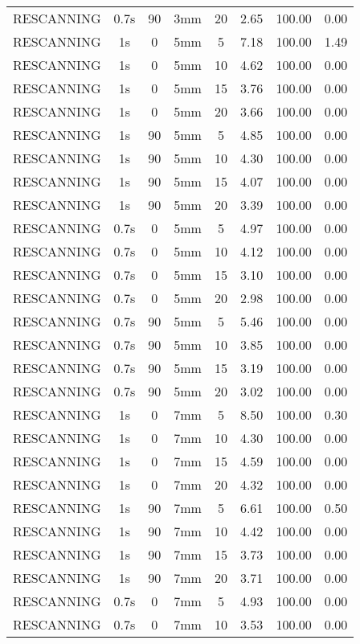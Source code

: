 \begin{table}[H]
\begin{tabular}{|c||c|c|c|c||c|c|c|}
RESCANNING & 0.7s & 90 & 3mm & 20 & 2.65 & 100.00 & 0.00 \\
RESCANNING & 1s & 0 & 5mm & 5 & 7.18 & 100.00 & 1.49 \\
RESCANNING & 1s & 0 & 5mm & 10 & 4.62 & 100.00 & 0.00 \\
RESCANNING & 1s & 0 & 5mm & 15 & 3.76 & 100.00 & 0.00 \\
RESCANNING & 1s & 0 & 5mm & 20 & 3.66 & 100.00 & 0.00 \\
RESCANNING & 1s & 90 & 5mm & 5 & 4.85 & 100.00 & 0.00 \\
RESCANNING & 1s & 90 & 5mm & 10 & 4.30 & 100.00 & 0.00 \\
RESCANNING & 1s & 90 & 5mm & 15 & 4.07 & 100.00 & 0.00 \\
RESCANNING & 1s & 90 & 5mm & 20 & 3.39 & 100.00 & 0.00 \\
RESCANNING & 0.7s & 0 & 5mm & 5 & 4.97 & 100.00 & 0.00 \\
RESCANNING & 0.7s & 0 & 5mm & 10 & 4.12 & 100.00 & 0.00 \\
RESCANNING & 0.7s & 0 & 5mm & 15 & 3.10 & 100.00 & 0.00 \\
RESCANNING & 0.7s & 0 & 5mm & 20 & 2.98 & 100.00 & 0.00 \\
RESCANNING & 0.7s & 90 & 5mm & 5 & 5.46 & 100.00 & 0.00 \\
RESCANNING & 0.7s & 90 & 5mm & 10 & 3.85 & 100.00 & 0.00 \\
RESCANNING & 0.7s & 90 & 5mm & 15 & 3.19 & 100.00 & 0.00 \\
RESCANNING & 0.7s & 90 & 5mm & 20 & 3.02 & 100.00 & 0.00 \\
RESCANNING & 1s & 0 & 7mm & 5 & 8.50 & 100.00 & 0.30 \\
RESCANNING & 1s & 0 & 7mm & 10 & 4.30 & 100.00 & 0.00 \\
RESCANNING & 1s & 0 & 7mm & 15 & 4.59 & 100.00 & 0.00 \\
RESCANNING & 1s & 0 & 7mm & 20 & 4.32 & 100.00 & 0.00 \\
RESCANNING & 1s & 90 & 7mm & 5 & 6.61 & 100.00 & 0.50 \\
RESCANNING & 1s & 90 & 7mm & 10 & 4.42 & 100.00 & 0.00 \\
RESCANNING & 1s & 90 & 7mm & 15 & 3.73 & 100.00 & 0.00 \\
RESCANNING & 1s & 90 & 7mm & 20 & 3.71 & 100.00 & 0.00 \\
RESCANNING & 0.7s & 0 & 7mm & 5 & 4.93 & 100.00 & 0.00 \\
RESCANNING & 0.7s & 0 & 7mm & 10 & 3.53 & 100.00 & 0.00 \\

\end{tabular}
\end{table}
